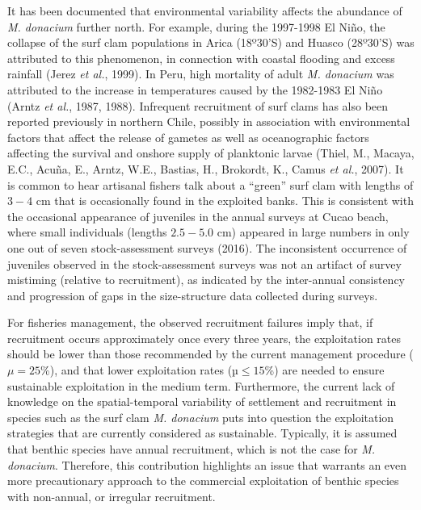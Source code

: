 \documentclass[12pt]{article}
\begin{document}
It has been documented that environmental variability affects the
abundance of \emph{M. donacium} further north. For example, during the
1997-1998 El Niño, the collapse of the surf clam populations in Arica
(18º30'S) and Huasco (28º30'S) was attributed to this phenomenon, in
connection with coastal flooding and excess rainfall (Jerez \emph{et
al.}, 1999). In Peru, high mortality of adult \emph{M. donacium} was
attributed to the increase in temperatures caused by the 1982-1983 El
Niño (Arntz \emph{et al.}, 1987, 1988). Infrequent recruitment of surf
clams has also been reported previously in northern Chile, possibly in
association with environmental factors that affect the release of
gametes as well as oceanographic factors affecting the survival and
onshore supply of planktonic larvae (Thiel, M., Macaya, E.C., Acuña, E.,
Arntz, W.E., Bastias, H., Brokordt, K., Camus \emph{et al.}, 2007). It
is common to hear artisanal fishers talk about a ``green'' surf clam
with lengths of \(3-4\) cm that is occasionally found in the exploited
banks. This is consistent with the occasional appearance of juveniles in
the annual surveys at Cucao beach, where small individuals (lengths
\(2.5-5.0\) cm) appeared in large numbers in only one out of seven
stock-assessment surveys (2016). The inconsistent occurrence of
juveniles observed in the stock-assessment surveys was not an artifact
of survey mistiming (relative to recruitment), as indicated by the
inter-annual consistency and progression of gaps in the size-structure
data collected during surveys.

For fisheries management, the observed recruitment failures imply that,
if recruitment occurs approximately once every three years, the
exploitation rates should be lower than those recommended by the current
management procedure (\(\mu= 25\)\%), and that lower exploitation rates
(\(µ \leq 15\)\%) are needed to ensure sustainable exploitation in the
medium term. Furthermore, the current lack of knowledge on the
spatial-temporal variability of settlement and recruitment in species
such as the surf clam \emph{M. donacium} puts into question the
exploitation strategies that are currently considered as sustainable.
Typically, it is assumed that benthic species have annual recruitment,
which is not the case for \emph{M. donacium}. Therefore, this
contribution highlights an issue that warrants an even more
precautionary approach to the commercial exploitation of benthic species
with non-annual, or irregular recruitment.
\end{document}
